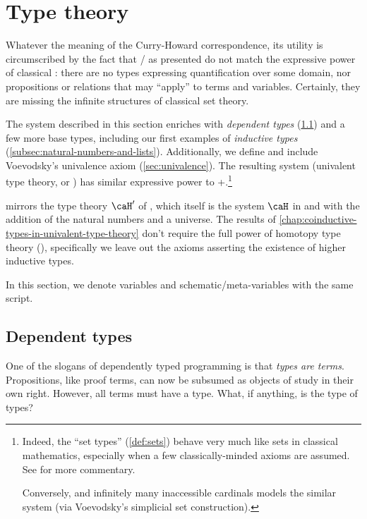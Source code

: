 \documentclass[./thesis.tex]{subfiles}
\begin{document}
\chapter{Type theory}
\label{chap:type-theory}

Whatever the meaning of the Curry-Howard correspondence, its utility is
circumscribed by the fact that \IPL{}/\TLC{} as
presented do not match the expressive power of classical \FOL{}:
there are no types expressing quantification over some domain, nor propositions
or relations that may ``apply'' to terms and variables. Certainly, they are
missing the infinite structures of classical set theory.

The system described in this section enriches \TLC{} with
\textit{dependent types} (\cref{sec:dependent-types}) and a few more base types,
including our first examples of \textit{inductive types}
(\cref{subsec:natural-numbers-and-lists}). Additionally, we define and include
Voevodsky's univalence axiom (\cref{sec:univalence}). The
resulting system (univalent type theory, or \UTT{}) has similar
expressive power to \ZFC{}+\FOL{}.\footnote{Indeed, the
  ``set types'' (\cref{def:sets}) behave very much like sets in classical
  mathematics, especially when a few classically-minded axioms are assumed. See
  \cite{book} for more commentary.

  Conversely, \ZFC{} and infinitely many inaccessible cardinals models the
  similar system \HoTT{} (via Voevodsky's simplicial set construction).}

\UTT{} mirrors the type theory $\caH'$ of \cite{homotopy-limits}, which itself
is the system $\caH$ in \cite{inductive} and \cite{homotopy-initial} with the
addition of the natural numbers and a universe. The results of
\cref{chap:coinductive-types-in-univalent-type-theory} don't
require the full power of homotopy type theory (\HoTT), specifically we leave
out the axioms asserting the existence of higher inductive types.

\begin{notation}
  In this section, we denote variables and schematic/meta-variables with the
  same script.
\end{notation}

\section{Dependent types}
\label{sec:dependent-types}

One of the slogans of dependently typed programming is that \textit{types are
terms}. Propositions, like proof terms, can now be subsumed as objects of study
in their own right. However, all terms must have a type. What, if anything, is
the type of types?
\end{document}
